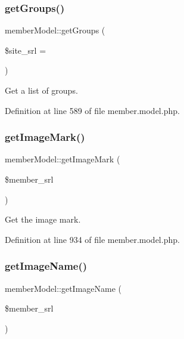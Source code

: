 \subsubsection{\texorpdfstring{get\+Groups()}{getGroups()}}
{\footnotesize\ttfamily member\+Model\+::get\+Groups (\begin{DoxyParamCaption}\item[{}]{\$site\+\_\+srl = {} }\end{DoxyParamCaption})}



Get a list of groups. 



Definition at line 589 of file member.\+model.\+php.

\hypertarget{classmemberModel_a3c40e02685bba4add5cfbe95c7fae372}{}\label{classmemberModel_a3c40e02685bba4add5cfbe95c7fae372} 
\subsubsection{\texorpdfstring{get\+Image\+Mark()}{getImageMark()}}
{\footnotesize\ttfamily member\+Model\+::get\+Image\+Mark (\begin{DoxyParamCaption}\item[{}]{\$member\+\_\+srl }\end{DoxyParamCaption})}



Get the image mark. 



Definition at line 934 of file member.\+model.\+php.

\hypertarget{classmemberModel_a127758d897360c92484d27fcc6183254}{}\label{classmemberModel_a127758d897360c92484d27fcc6183254} 
\subsubsection{\texorpdfstring{get\+Image\+Name()}{getImageName()}}
{\footnotesize\ttfamily member\+Model\+::get\+Image\+Name (\begin{DoxyParamCaption}\item[{}]{\$member\+\_\+srl }\end{DoxyParamCaption})}



